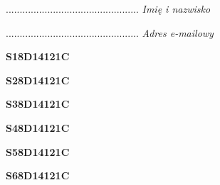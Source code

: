 \begin{turn}{90}\begin{minipage}{\linewidth} \vspace{20mm} ................................................  \textit{Imię i nazwisko}\end{minipage}\end{turn}

\begin{turn}{90}\begin{minipage}{\linewidth} \vspace{20mm} ................................................  \textit{Adres e-mailowy}\end{minipage}\end{turn}

\begin{turn}{90}\huge \begin{minipage}{\linewidth} \vspace{10mm}\textbf{S18D14121C}\end{minipage}\end{turn}

\begin{turn}{90}\huge \begin{minipage}{\linewidth} \vspace{10mm}\textbf{S28D14121C}\end{minipage}\end{turn}

\begin{turn}{90}\huge \begin{minipage}{\linewidth} \vspace{10mm}\textbf{S38D14121C}\end{minipage}\end{turn}

\begin{turn}{90}\huge \begin{minipage}{\linewidth} \vspace{10mm}\textbf{S48D14121C}\end{minipage}\end{turn}

\begin{turn}{90}\huge \begin{minipage}{\linewidth} \vspace{10mm}\textbf{S58D14121C}\end{minipage}\end{turn}

\begin{turn}{90}\huge \begin{minipage}{\linewidth} \vspace{10mm}\textbf{S68D14121C}\end{minipage}\end{turn}

